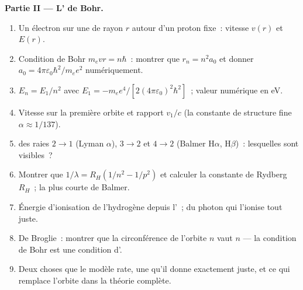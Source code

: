 \begin{problem}
\medskip
\noindent\textbf{Partie II --- L' de Bohr.}
\begin{enumerate}[resume]
  \item Un électron sur une  de rayon $r$ autour d'un
        proton fixe~: vitesse $v(r)$ et  $E(r)$.
  \item Condition de Bohr $m_evr = n\hbar$~: montrer que $r_n = n^2a_0$ et
        donner $a_0 = 4\pi\varepsilon_0\hbar^2/m_ee^2$ numériquement.
  \item $E_n = E_1/n^2$ avec $E_1 = -m_ee^4/[2(4\pi\varepsilon_0)^2\hbar^2]$~;
        valeur numérique en eV.
  \item Vitesse sur la première orbite et rapport $v_1/c$ (la constante
        de structure fine $\alpha \approx 1/137$).
  \item {} des raies $2 \to 1$ (Lyman $\alpha$), $3 \to 2$ et
        $4 \to 2$ (Balmer H$\alpha$, H$\beta$)~: lesquelles sont visibles~?
  \item Montrer que $1/\lambda = R_H(1/n^2 - 1/p^2)$ et calculer la constante
        de Rydberg $R_H$~; la plus courte  de Balmer.
  \item Énergie d'ionisation de l'hydrogène depuis l'~;
         du photon qui l'ionise tout juste.
  \item De Broglie~: montrer que la circonférence de l'orbite $n$ vaut $n$
         --- la condition de Bohr est une condition d'.
  \item Deux choses que le modèle rate, une qu'il donne exactement juste,
        et ce qui remplace l'orbite dans la théorie complète.
\end{enumerate}


\end{problem}
